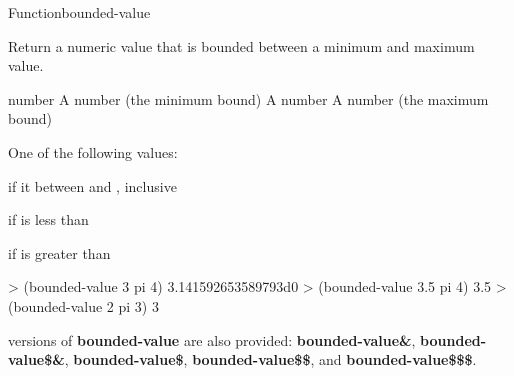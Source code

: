 \documentclass[10pt,twoside,english,pdftex]{article}
\begin{document}
\begin{functiondoc}{Function}{bounded-value}{
  \returns{} }
%

\fnsyntax

\fnpurpose Return a numeric value that is bounded between a minimum
and maximum value.

\fnpackage {}

\fnmodule {}

\fnargs
\begin{args}{number}
\arg[min] A number (the minimum bound)
\arg[number] A number
\arg[max] A number (the maximum bound)
\end{args}

\fnreturns One of the following values:
\begin{tightitemize}
\item {} if it between  and , inclusive
\item {} if  is less than 
\item {} if  is greater than 
\end{tightitemize}

\fnexamples
\begin{example}
%
\W\supp
> (bounded-value 3 pi 4)
3.141592653589793d0
> (bounded-value 3.5 pi 4)
3.5
> (bounded-value 2 pi 3)
3
\end{example}

\fnnote
%
%
%
%
%
%
%
 versions of
\textbf{bounded-value} are also provided: \textbf{bounded-value\&},
\textbf{bounded-value\$\&}, \textbf{bounded-value\$},
\textbf{bounded-value\$\$}, and \textbf{bounded-value\$\$\$}.

\end{functiondoc}

\end{document}
